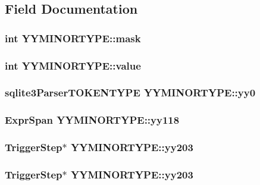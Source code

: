 \subsection{Field Documentation}
\subsubsection{\setlength{\rightskip}{0pt plus 5cm}int \bf{YYMINORTYPE::mask}}\label{unionYYMINORTYPE_2ae63e180e2e05b790619269a8100ca1}


\subsubsection{\setlength{\rightskip}{0pt plus 5cm}int \bf{YYMINORTYPE::value}}\label{unionYYMINORTYPE_2af487956ebf1a5b102f3806b762703e}


\subsubsection{\setlength{\rightskip}{0pt plus 5cm}sqlite3Parser\-TOKENTYPE \bf{YYMINORTYPE::yy0}}\label{unionYYMINORTYPE_846ac89a278b227910655692b54bb523}


\subsubsection{\setlength{\rightskip}{0pt plus 5cm}\bf{Expr\-Span} \bf{YYMINORTYPE::yy118}}\label{unionYYMINORTYPE_470a541e22ba3970b0372a1b2bb0a89a}


\subsubsection{\setlength{\rightskip}{0pt plus 5cm}\bf{Trigger\-Step}$\ast$ \bf{YYMINORTYPE::yy203}}\label{unionYYMINORTYPE_dd312750341e3832f94f44e9d462c0f4}


\subsubsection{\setlength{\rightskip}{0pt plus 5cm}\bf{Trigger\-Step}$\ast$ \bf{YYMINORTYPE::yy203}}\label{unionYYMINORTYPE_dd312750341e3832f94f44e9d462c0f4}


